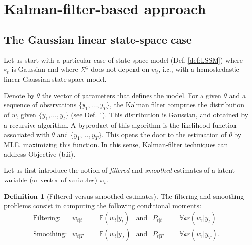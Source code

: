 \documentclass[
  12pt,
]{book}
\theoremstyle{definition}
\newtheorem{definition}{Definition}[chapter]
\theoremstyle{definition}
\theoremstyle{definition}
\theoremstyle{definition}
\theoremstyle{remark}
\begin{document}
\hypertarget{Estimation:KF}{%
\section{Kalman-filter-based approach}\label{Estimation:KF}}

\hypertarget{the-gaussian-linear-state-space-case}{%
\subsection{The Gaussian linear state-space case}\label{the-gaussian-linear-state-space-case}}

Let us start with a particular case of state-space model (Def. \ref{def:LSSM}) where \(\varepsilon_t\) is Gaussian and where \(\Sigma^{\frac{1}{2}}\) does not depend on \(w_t\), i.e., with a homoskedastic linear Gaussian state-space model.

Denote by \(\theta\) the vector of parameters that defines the model. For a given \(\theta\) and a sequence of observations \(\{y_1,\dots,y_T\}\), the Kalman filter computes the distribution of \(w_t\) given \(\{y_1,\dots,y_t\}\) (see Def. \ref{def:FiltvsSmooth}). This distribution is Gaussian, and obtained by a recursive algorithm. A byproduct of this algorithm is the likelihood function associated with \(\theta\) and \(\{y_1,\dots,y_T\}\). This opens the door to the estimation of \(\theta\) by MLE, maximizing this function. In this sense, Kalman-filter techniques can address Objective (b.ii).

Let us first introduce the notion of \emph{filtered} and \emph{smoothed} estimates of a latent variable (or vector of variables) \(w_t\):

\begin{definition}[Filtered versus smoothed estimates]
\protect\hypertarget{def:FiltvsSmooth}{}\label{def:FiltvsSmooth}The filtering and smoothing problems consist in computing the following conditional moments:
\begin{equation*}
\begin{array}{lccllllll}
\mbox{Filtering:} & w_{t|t} & = & \mathbb{E}(w_t|\underline{y_t}) & \mbox{and}  & P_{t|t} &=& \mathbb{V}ar(w_t|\underline{y_t})\\
\mbox{Smoothing:} & w_{t|T} & = & \mathbb{E}(w_t|\underline{y_T}) & \mbox{and} & P_{t|T} &=& \mathbb{V}ar(w_t|\underline{y_T}).
\end{array}
\end{equation*}
\end{definition}
\end{document}

